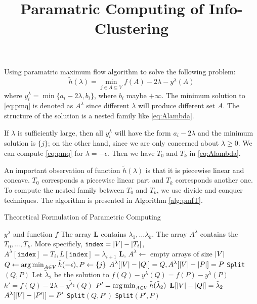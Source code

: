 \documentclass{article}
\title{Paramatric Computing of Info-Clustering}
\begin{document}
\maketitle
Using paramatric maximum flow algorithm to solve the following problem:
\begin{equation}\label{eq:pmq}
\tilde{h}(\lambda) = \min_{j \in A \subseteq V} f(A) - 2\lambda - y^{\lambda}(A)
\end{equation}
where
$y^{\lambda}_i = \min\{a_i - 2\lambda, b_i\}$, where $b_i$ maybe $+\infty$.
The minimum solution to \eqref{eq:pmq} is denoted as $A^{\lambda}$ since different $\lambda$ will produce different set $A$. The structure of the solution is a nested family like \eqref{eq:Alambda}.

If $\lambda$ is sufficiently large, then all $y_i^{\lambda}$ will have the form $a_i - 2 \lambda$ and the minimum solution is $\{j\}$; on the other hand, since we are only concerned about $\lambda \geq 0$. We can compute \eqref{eq:pmq} for $\lambda = -\epsilon$. Then we have $T_0$ and $T_k$ in \eqref{eq:Alambda}.

An important observation of function $\tilde{h}(\lambda)$ is that it is piecewise linear and concave. $T_0$ corresponds a piecewise linear part and $T_k$ corresponds another one.  To compute the nested family between $T_0$ and $T_k$, we use divide and conquer techniques. The algorithm is presented in Algorithm \ref{alg:pmfT}.

\begin{algorithm}
\caption{Theoretical Formulation of Parametric Computing}\label{alg:pmfT}
\begin{algorithmic}[1]
\REQUIRE $y^{\lambda}$ and function $f$
\ENSURE The array \textbf{L} contains $\lambda_1, \dots \lambda_k$. The array $A^{\lambda}$ contains the $T_0,\dots, T_k$. More specificly, $\mathtt{index} = \lvert V\rvert - \lvert T_i\rvert$, $A^{\lambda}[\mathtt{index}]=T_i,  L[\mathtt{index}]=\lambda_{i+1}$\footnotemark
\STATE \textbf{L}, $A^{\lambda} \leftarrow$ empty arrays of size $\lvert V\rvert$
\STATE $Q \leftarrow \operatorname*{arg\,min}_{A\in V} \tilde{h}(-\epsilon), P \leftarrow \{ j \}$
\STATE $A^{\lambda}[ \lvert V\rvert-\lvert Q\rvert]=Q, A^{\lambda}[ \lvert V\rvert-\lvert P\rvert] = P$
\STATE \texttt{Split}$(Q,P)$
\STATE Let $\tilde{\lambda}_2$ be the solution to $f(Q) - y^{\lambda}(Q) = f(P) - y^{\lambda}(P)$
\STATE $h' = f(Q) - 2\lambda - y^{\tilde{\lambda}_2}(Q)$
 \STATE $P' =\operatorname*{arg\,min}_{A\in V} \tilde{h}(\tilde{\lambda}_2) $ 
 	\STATE $\mathbf{L}[\lvert V\rvert - \lvert Q\rvert] = \tilde{\lambda}_2$
 \ELSE
 	\STATE $A^{\lambda}[\lvert V\rvert - \lvert P'\rvert]=P'$
 	\STATE \texttt{Split}$(Q,P')$
 	\STATE \texttt{Split}$(P',P)$
 \ENDIF
\ENDFUNCTION
\end{algorithmic}
\end{algorithm}
\end{document}
